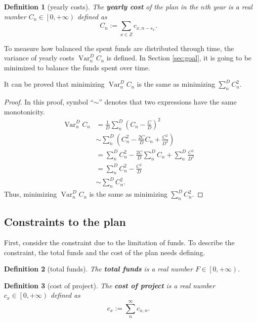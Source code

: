 \documentclass{article}
\DeclareMathOperator*{\var}{Var}
\newtheorem{definition}{Definition}
\begin{document}
\begin{definition}[yearly costs]
The \textbf{yearly cost} of the plan in the $n$th year is a real number $C_n\in\left[0,+\infty\right)$ defined as
\begin{equation}
C_n:=\sum_{x\in Z}c_{x,n-s_x}.
\end{equation}
\end{definition}

To measure how balanced the spent funds are distributed through time, the variance of yearly costs $\var_n^DC_n$ is defined.
In Section \ref{sec:goal}, it is going to be minimized to balance the funds spent over time.

It can be proved that minimizing $\var_n^DC_n$ is the same as minimizing $\sum_n^DC_n^2$.

\begin{proof}
In this proof, symbol ``$\sim$'' denotes that two expressions have the same monotonicity.
\begin{align*}
\var_n^DC_n&=\frac1D\sum_n^D\left(C_n-\frac CD\right)^2\\
&\sim\sum_n^D\left(C_n^2-\frac{2C}DC_n+\frac{C^2}{D^2}\right)\\
&=\sum_n^DC_n^2-\frac{2C}D\sum_n^DC_n+\sum_n^D\frac{C^2}{D^2}\\
&=\sum_n^DC_n^2-\frac{C^2}D\\
&\sim\sum_n^DC_n^2.
\end{align*}
Thus, minimizing $\var_n^DC_n$ is the same as minimizing $\sum_n^DC_n^2$.
\end{proof}

\subsection{Constraints to the plan}
\label{sec:constraints}

First, consider the constraint due to the limitation of funds.
To describe the constraint, the total funds and the cost of the plan needs defining.

\begin{definition}[total funds]
The \textbf{total funds} is a real number $F\in\left[0,+\infty\right)$.
\end{definition}

\begin{definition}[cost of project]
The \textbf{cost of project} is a real number $c_x\in\left[0,+\infty\right)$ defined as
\begin{equation}
c_x:=\sum_n^\infty c_{x,n}.
\end{equation}
\end{definition}
\end{document}
